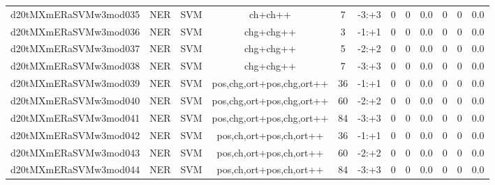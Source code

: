 \documentclass[a4paper]{article}
\begin{document}
\begin{landscape}
\begin{center}
\begin{tabular}{ |c|c|c|c|c|c|c|c|c|c|c|c|}
 
 	
 	\small{ d20tMXmERaSVMw3mod035 } & \small{ NER} & \small{  SVM }  & ch+ch++  &  7 &  \small{  -3:+3 }  &  0 & 0 & 0.0  &  0 & 0 & 0.0 \\
 	

 
 	
 	\small{ d20tMXmERaSVMw3mod036 } & \small{ NER} & \small{  SVM }  & chg+chg++  &  3 &  \small{  -1:+1 }  &  0 & 0 & 0.0  &  0 & 0 & 0.0 \\
 	

 
 	
 	\small{ d20tMXmERaSVMw3mod037 } & \small{ NER} & \small{  SVM }  & chg+chg++  &  5 &  \small{  -2:+2 }  &  0 & 0 & 0.0  &  0 & 0 & 0.0 \\
 	

 
 	
 	\small{ d20tMXmERaSVMw3mod038 } & \small{ NER} & \small{  SVM }  & chg+chg++  &  7 &  \small{  -3:+3 }  &  0 & 0 & 0.0  &  0 & 0 & 0.0 \\
 	

 
 	
 	\small{ d20tMXmERaSVMw3mod039 } & \small{ NER} & \small{  SVM }  & pos,chg,ort+pos,chg,ort++  &  36 &  \small{  -1:+1 }  &  0 & 0 & 0.0  &  0 & 0 & 0.0 \\
 	

 
 	
 	\small{ d20tMXmERaSVMw3mod040 } & \small{ NER} & \small{  SVM }  & pos,chg,ort+pos,chg,ort++  &  60 &  \small{  -2:+2 }  &  0 & 0 & 0.0  &  0 & 0 & 0.0 \\
 	

 
 	
 	\small{ d20tMXmERaSVMw3mod041 } & \small{ NER} & \small{  SVM }  & pos,chg,ort+pos,chg,ort++  &  84 &  \small{  -3:+3 }  &  0 & 0 & 0.0  &  0 & 0 & 0.0 \\
 	

 
 	
 	\small{ d20tMXmERaSVMw3mod042 } & \small{ NER} & \small{  SVM }  & pos,ch,ort+pos,ch,ort++  &  36 &  \small{  -1:+1 }  &  0 & 0 & 0.0  &  0 & 0 & 0.0 \\
 	

 
 	
 	\small{ d20tMXmERaSVMw3mod043 } & \small{ NER} & \small{  SVM }  & pos,ch,ort+pos,ch,ort++  &  60 &  \small{  -2:+2 }  &  0 & 0 & 0.0  &  0 & 0 & 0.0 \\
 	

 
 	
 	\small{ d20tMXmERaSVMw3mod044 } & \small{ NER} & \small{  SVM }  & pos,ch,ort+pos,ch,ort++  &  84 &  \small{  -3:+3 }  &  0 & 0 & 0.0  &  0 & 0 & 0.0 \\
 	


\end{tabular}
\end{center}
\end{landscape}
\end{document}
